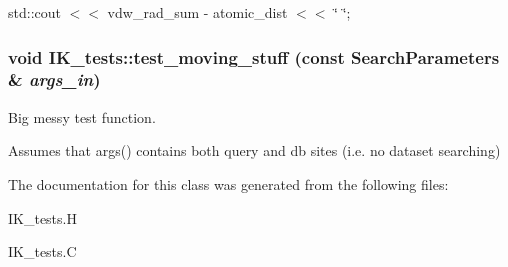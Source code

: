 std::cout $<$$<$ vdw\_\-rad\_\-sum - atomic\_\-dist $<$$<$ \char`\"{} \char`\"{}; 
\subsubsection{\setlength{\rightskip}{0pt plus 5cm}void IK\_\-tests::test\_\-moving\_\-stuff (const \bf{Search\-Parameters} \& {\em args\_\-in})}\label{classASCbase_1_1IK__tests_f4fdeb2d068d4b958a999d2c2673c183}


Big messy test function. 

Assumes that args() contains both query and db sites (i.e. no dataset searching) 

The documentation for this class was generated from the following files:\begin{CompactItemize}
\item 
IK\_\-tests.H\item 
IK\_\-tests.C\end{CompactItemize}
